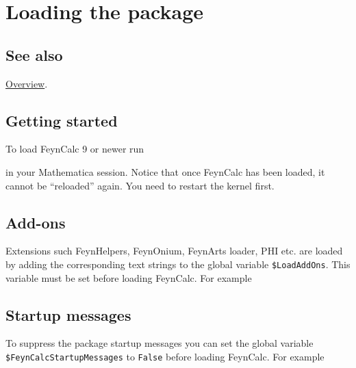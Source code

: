 \documentclass[../FeynCalcManual.tex]{subfiles}
\begin{document}
\hypertarget{loading the package}{
\section{Loading the package}\label{loading the package}}

\subsection{See also}

\hyperlink{toc}{Overview}.

\subsection{Getting started}\label{getting-started}

To load FeynCalc 9 or newer run

\begin{Shaded}
\begin{Highlighting}[]
\end{Highlighting}
\end{Shaded}

in your Mathematica session. Notice that once FeynCalc has been loaded,
it cannot be ``reloaded'' again. You need to restart the kernel first.

\subsection{Add-ons}\label{add-ons}

Extensions such FeynHelpers, FeynOnium, FeynArts loader, PHI etc. are
loaded by adding the corresponding text strings to the global variable
\texttt{\$LoadAddOns}. This variable must be set before loading
FeynCalc. For example

\begin{Shaded}
\begin{Highlighting}[]
\ExtensionTok{=}\OperatorTok{\{}\OperatorTok{,}\OperatorTok{\}}\NormalTok{;}
\end{Highlighting}
\end{Shaded}

\subsection{Startup messages}\label{startup-messages}

To suppress the package startup messages you can set the global variable
\texttt{\$FeynCalcStartupMessages} to \texttt{False} before loading
FeynCalc. For example

\begin{Shaded}
\begin{Highlighting}[]
\ExtensionTok{=}\NormalTok{;}
\end{Highlighting}
\end{Shaded}
\end{document}
